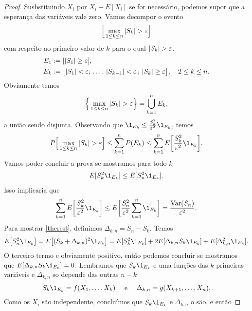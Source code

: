 \begin{topics}
\begin{proof}
  Susbstituindo $X_i$ por $X_i-E[X_i]$ se for necessário, podemos supor que a esperança das variáveis vale zero.
  Vamos decompor o evento
  \begin{equation}
    \Big[ \max_{1\le k\le n} |S_k|>\gep \Big]
  \end{equation}
  com respeito ao primeiro valor de $k$ para o qual $|S_k|>\gep$.
 \begin{equation}
   \begin{split}
     E_1 & := [|S_1|\ge \varepsilon ],\\
     E_k & := \big[
           |S_1|<\varepsilon;\, \dots ;\,  |S_{k-1}|<\varepsilon\, ;  \, |S_k|\ge \varepsilon
           \big], \quad 2\le k\le n.
   \end{split}
 \end{equation}
 Obviamente temos
 \begin{equation}
   \label{eq:1}
   \Big\{\max_{1 \le k\le n} |S_k|>\gep \Big\} = \bigcup_{k=1}^n E_k,
 \end{equation}
a união sendo disjunta.
 Observando que $\1_{E_k} \leq \tfrac{S_k^2}{\gep^2} \1_{E_k}$, temos
 \begin{equation}
   P \Big[
   \max_{1\le k\le n} |S_k|>\gep
   \Big]
   \le \sum_{k=1}^n P(E_k)\le  \sum_{k=1}^n E \bigg[
   \frac{S^2_k}{\gep^2}\1_{E_k}
   \bigg].
 \end{equation}
 Vamos poder concluir a prova se mostramos para todo $k$
 \begin{equation}\label{therest}
   E[S^2_k\1_{E_k}]\le E[S^2_n\1_{E_k}].
 \end{equation}
 Isso implicaria que
 \begin{equation}
   \sum_{k=1}^n E \bigg[ \frac{S^2_k}{\gep^2}\1_{E_k} \bigg]
   \le E \bigg[ \frac{S^2_n}{\gep^2}  \sum_{k=1}^n \1_{E_k} \bigg]
   = \frac{\Var(S_n)}{\gep^2}.
 \end{equation}
 Para mostrar \eqref{therest}, definimos $\Delta_{k,n}= S_n-S_k$.
 Temos
 \begin{equation}
   E \big[ S^2_n\1_{E_k} \big]
   = E \big[ (S_k + \Delta_{k,n})^2\1_{E_k} \big]
   = E[S_k^2\1_{E_k}]+2 E[ \Delta_{k,n} S_k \1_{E_k}]
     + E[ \Delta^2_{k,n}\1_{E_k}].
 \end{equation}
 O terceiro termo e obviamente positivo, então podemos concluir se mostramos  que $E[ \Delta_{k,n} S_k \1_{E_k}]=0$.
 Lembramos que $S_k\1_{E_k}$ e uma funções das $k$ primeiras variáveis e $\Delta_{k,n}$ so depende das outras $n-k$
 \begin{equation}
   S_k \1_{E_k}=f(X_1,\dots,X_k) \quad \text{ e } \quad \Delta_{k,n}=g(X_{k+1},\dots,X_{n}),
 \end{equation}
 Como os $X_i$ são independente, concluímos que  $S_k \1_{E_k}$ e $\Delta_{k,n}$ o são, e então


\end{proof}
\end{topics}
